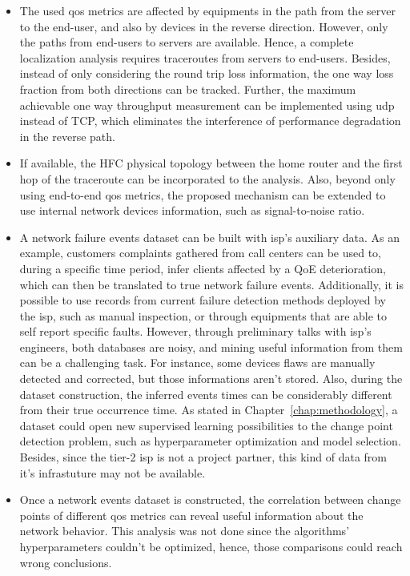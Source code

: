 \begin{itemize}
\item
The used \gls*{qos} metrics are affected by equipments in the path from the server to
the end-user, and also by devices in the reverse direction.
However, only the paths from end-users to servers are available.
Hence, a complete
localization analysis requires traceroutes from servers to end-users.
Besides, instead of only considering the round trip loss information,
the one way loss fraction from both directions can be tracked.
Further, the maximum achievable one way throughput measurement can be
implemented using \gls*{udp} instead of TCP, which eliminates the interference of
performance degradation in the reverse path.

\item
If available, the HFC physical topology between the home router and the
first hop of the traceroute can be incorporated to the analysis.
Also, beyond only using end-to-end \gls*{qos} metrics,
the proposed mechanism can be extended
to use internal network devices information, such as signal-to-noise ratio.

\item
A network failure events dataset can be built with \gls*{isp}'s auxiliary data.
As an example, customers complaints gathered from call centers can be used to,
during a specific time period, infer clients affected by a QoE deterioration,
which can then be translated to true network failure events.
Additionally, it is possible to use records from current failure detection
methods deployed by the \gls*{isp}, such as manual inspection, or through equipments
that are able to self report specific faults.
However, through preliminary talks with \gls*{isp}'s engineers,
both databases are noisy, and mining useful information
from them can be a challenging task.
For instance, some devices flaws are manually
detected and corrected, but those informations aren't stored.
Also, during the dataset construction, the inferred events times can be
considerably different from their true occurrence time.
As stated in Chapter~\ref{chap:methodology}, a dataset could open new
supervised learning possibilities to the change point detection problem, such
as hyperparameter optimization and model selection.
Besides, since the tier-2 \gls*{isp} is not a project partner, this kind of data from
it's infrastuture may not be available.

\item
Once a network events dataset is constructed, the correlation between
change points of different \gls*{qos} metrics can reveal useful information
about the network behavior. This analysis was not done since the algorithms'
hyperparameters couldn't be optimized, hence, those comparisons could reach
wrong conclusions.


\end{itemize}
